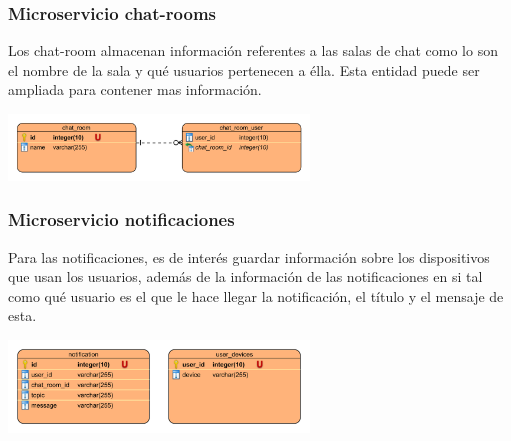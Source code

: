 \subsubsection{Microservicio chat-rooms}
Los chat-room almacenan información referentes a las salas de chat como lo son el nombre de la sala y qué usuarios pertenecen a élla. Esta entidad puede ser ampliada para contener mas información.
\begin{center}
\includegraphics[width=8cm]{Figures/P3/DataModelChatroom.png}    
\end{center}
\subsubsection{Microservicio notificaciones}
Para las notificaciones, es de interés guardar información sobre los dispositivos que usan los usuarios, además de la información de las notificaciones en si tal como qué usuario es el que le hace llegar la notificación, el título y el mensaje de esta.
\begin{center}
\includegraphics[width=8cm]{Figures/P3/DataModelNotifications.png}        
\end{center}
